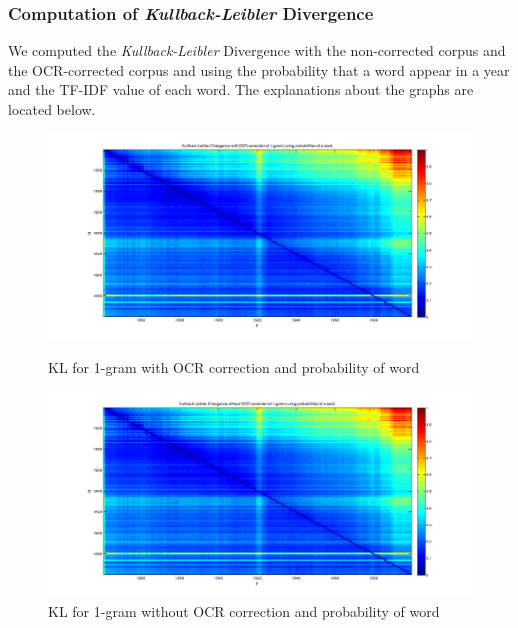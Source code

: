 \subsubsection{Computation of \emph{Kullback-Leibler} Divergence}
We computed the \emph{Kullback-Leibler} Divergence with the non-corrected corpus and the OCR-corrected corpus and using the probability that a word appear in a year and the TF-IDF value of each word. The explanations about the graphs are located below.

\begin{figure}[h!]
    \begin{minipage}[b]{0.48\linewidth}
        \includegraphics[scale=0.15]{Pictures/kullback-leibler/KL_1-grams_with_correction_proba.jpg}
        \caption{KL for 1-gram with OCR correction and probability of word}
        \label{}
    \end{minipage}\hfill
    \begin{minipage}[b]{0.5\linewidth}
        \includegraphics[scale=0.15]{Pictures/kullback-leibler/KL_1-grams_without_correction_proba.jpg}
        \caption{KL for 1-gram without OCR correction and probability of word}
        \label{}
    \end{minipage}\hfill
\end{figure}

